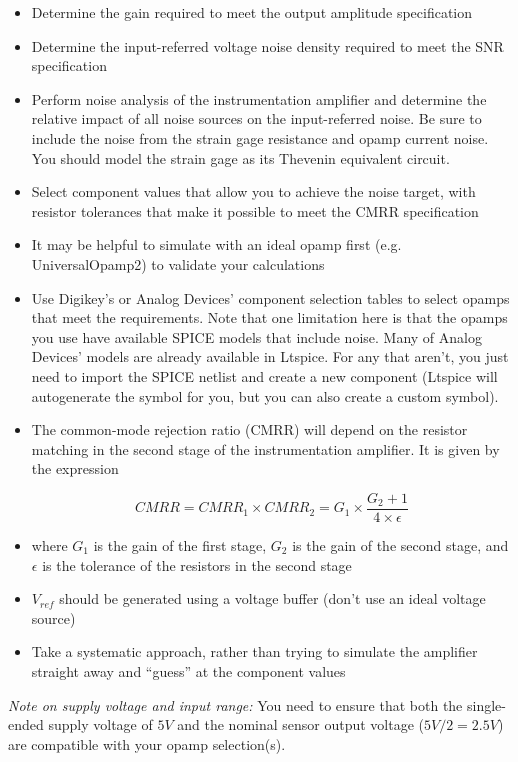 \documentclass[11pt]{article}
\begin{document}
\begin{itemize}
    \setlength{\itemsep}{2pt}
    \item Determine the gain required to meet the output amplitude specification
    \item Determine the input-referred voltage noise density required to meet the SNR specification
    \item Perform noise analysis of the instrumentation amplifier and determine the relative impact of all noise sources on the input-referred noise. Be sure to include the noise from the strain gage resistance and opamp current noise. You should model the strain gage as its Thevenin equivalent circuit.
    \item Select component values that allow you to achieve the noise target, with resistor tolerances that make it possible to meet the CMRR specification
    \item It may be helpful to simulate with an ideal opamp first (e.g. UniversalOpamp2) to validate your calculations
    \item Use Digikey's or Analog Devices' component selection tables to select opamps that meet the requirements. Note that one limitation here is that the opamps you use have available SPICE models that include noise. Many of Analog Devices' models are already available in Ltspice. For any that aren't, you just need to import the SPICE netlist and create a new component (Ltspice will autogenerate the symbol for you, but you can also create a custom symbol).
    \item The common-mode rejection ratio (CMRR) will depend on the resistor matching in the second stage of the instrumentation amplifier. It is given by the expression
    
    $$ CMRR = CMRR_1 \times CMRR_2 = G_1 \times \frac{G_2 + 1}{4 \times \epsilon} $$
    
    \item where $G_1$ is the gain of the first stage, $G_2$ is the gain of the second stage, and $\epsilon$ is the tolerance of the resistors in the second stage
    \item $V_{ref}$ should be generated using a voltage buffer (don't use an ideal voltage source)
    \item Take a systematic approach, rather than trying to simulate the amplifier straight away and ``guess'' at the component values
\end{itemize}

\vspace{1.5em}
\textit{Note on supply voltage and input range:} You need to ensure that both the single-ended supply voltage of $5V$ and the nominal sensor output voltage ($5V/2 = 2.5V$) are compatible with your opamp selection(s).
\end{document}
